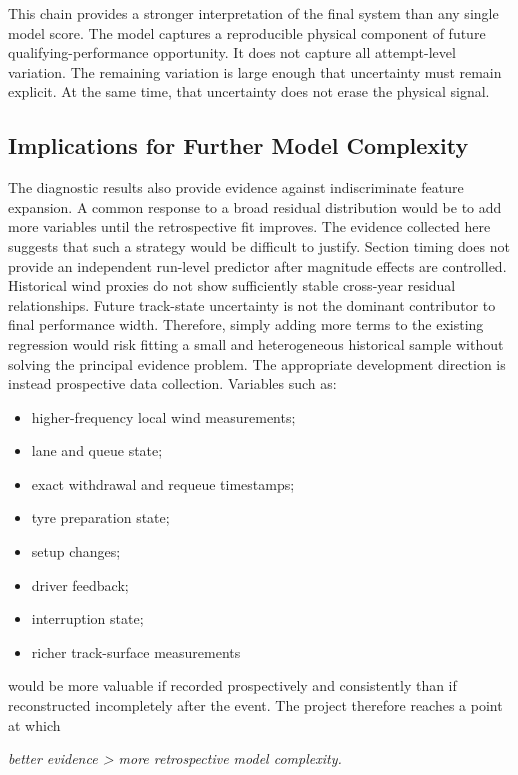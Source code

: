 This chain provides a stronger interpretation of the final system than any single model score. The model captures a reproducible physical component of future qualifying-performance opportunity. It does not capture all attempt-level variation. The remaining variation is large enough that uncertainty must remain explicit. At the same time, that uncertainty does not erase the physical signal.

\subsection{Implications for Further Model Complexity}
The diagnostic results also provide evidence against indiscriminate feature expansion. A common response to a broad residual distribution would be to add more variables until the retrospective fit improves. The evidence collected here suggests that such a strategy would be difficult to justify. Section timing does not provide an independent run-level predictor after magnitude effects are controlled. Historical wind proxies do not show sufficiently stable cross-year residual relationships. Future track-state uncertainty is not the dominant contributor to final performance width. Therefore, simply adding more terms to the existing regression would risk fitting a small and heterogeneous historical sample without solving the principal evidence problem. The appropriate development direction is instead prospective data collection. Variables such as:

\begin{itemize}
\item higher-frequency local wind measurements;
\item lane and queue state;
\item exact withdrawal and requeue timestamps;
\item tyre preparation state;
\item setup changes;
\item driver feedback;
\item interruption state;
\item richer track-surface measurements
\end{itemize}

would be more valuable if recorded prospectively and consistently than if reconstructed incompletely after the event. The project therefore reaches a point at which

\begin{center}\textit{better evidence > more retrospective model complexity.}\end{center}


